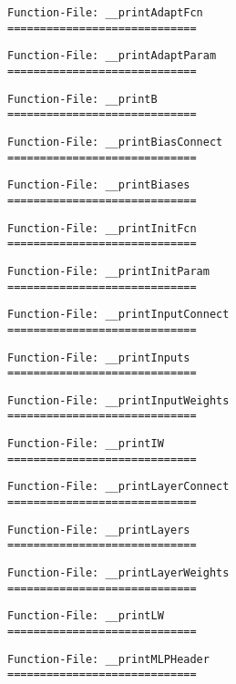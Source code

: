 \begin{verbatim}
Function-File: __printAdaptFcn
=============================
\end{verbatim}
\begin{verbatim}
Function-File: __printAdaptParam
=============================
\end{verbatim}
\begin{verbatim}
Function-File: __printB
=============================
\end{verbatim}
\begin{verbatim}
Function-File: __printBiasConnect
=============================
\end{verbatim}
\begin{verbatim}
Function-File: __printBiases
=============================
\end{verbatim}
\begin{verbatim}
Function-File: __printInitFcn
=============================
\end{verbatim}
\begin{verbatim}
Function-File: __printInitParam
=============================
\end{verbatim}
\begin{verbatim}
Function-File: __printInputConnect
=============================
\end{verbatim}
\begin{verbatim}
Function-File: __printInputs
=============================
\end{verbatim}
\begin{verbatim}
Function-File: __printInputWeights
=============================
\end{verbatim}
\begin{verbatim}
Function-File: __printIW
=============================
\end{verbatim}
\begin{verbatim}
Function-File: __printLayerConnect
=============================
\end{verbatim}
\begin{verbatim}
Function-File: __printLayers
=============================
\end{verbatim}
\begin{verbatim}
Function-File: __printLayerWeights
=============================
\end{verbatim}
\begin{verbatim}
Function-File: __printLW
=============================
\end{verbatim}
\begin{verbatim}
Function-File: __printMLPHeader
=============================
\end{verbatim}

